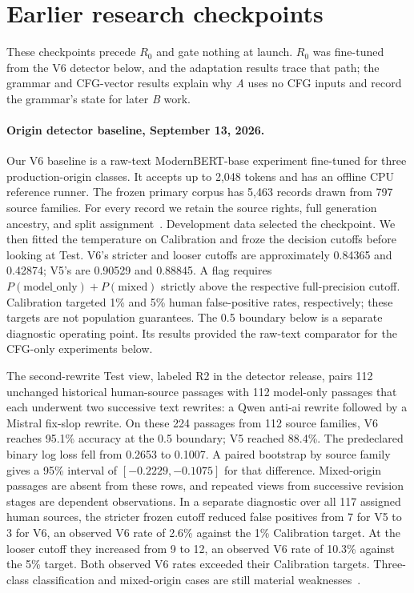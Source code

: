 \section{Earlier research checkpoints}\label{earlier-research-checkpoints}

These checkpoints precede \(R_0\) and gate nothing at launch. \(R_0\) was
fine-tuned from the V6 detector below, and the adaptation results trace that
path; the grammar and CFG-vector results explain why \textit{A} uses no CFG
inputs and record the grammar's state for later \textit{B} work.

\paragraph{Origin detector baseline, September 13, 2026.}
Our V6 baseline is a raw-text ModernBERT-base experiment fine-tuned for three
production-origin classes. It accepts up to 2,048 tokens and has an offline CPU
reference runner. The frozen primary corpus has 5,463 records drawn from 797
source families. For every record we retain the source rights, full generation
ancestry, and split assignment~\cite{detectorv6data}. Development data selected
the checkpoint. We then fitted the temperature on Calibration and froze the
decision cutoffs before looking at Test.
V6's stricter and looser cutoffs are approximately 0.84365 and 0.42874;
V5's are 0.90529 and 0.88845. A flag requires
$P(\mathrm{model\_only})+P(\mathrm{mixed})$ strictly above the respective
full-precision cutoff. Calibration targeted 1\% and 5\% human false-positive
rates, respectively; these targets are not population guarantees. The 0.5
boundary below is a separate diagnostic operating point.
Its results provided the raw-text comparator for the CFG-only experiments below.

The second-rewrite Test view, labeled R2 in the detector release, pairs 112
unchanged historical human-source passages with
112 model-only passages that each underwent two successive text rewrites:
a Qwen anti-ai rewrite followed by a Mistral fix-slop rewrite. On these 224
passages from 112 source families, V6 reaches 95.1\% accuracy at the 0.5
boundary; V5 reached 88.4\%. The predeclared binary
log loss fell from 0.2653 to 0.1007. A paired bootstrap by source family gives a
95\% interval of $[-0.2229,-0.1075]$ for that difference. Mixed-origin passages
are absent from these rows, and repeated views from successive revision stages
are dependent observations. In a separate diagnostic over all 117 assigned human
sources, the stricter frozen cutoff reduced false positives from 7 for V5 to 3
for V6, an observed V6 rate of 2.6\% against the 1\% Calibration target. At the
looser cutoff they increased from 9 to 12, an observed V6 rate of 10.3\% against
the 5\% target. Both observed V6 rates exceeded their Calibration targets.
Three-class classification and mixed-origin cases are
still material weaknesses~\cite{detectorv6}.

